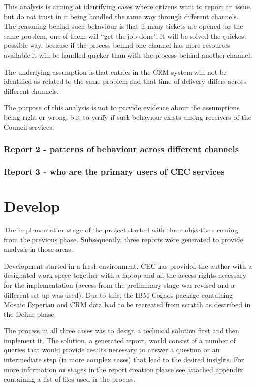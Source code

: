 This analysis is aiming at identifying cases where citizens want to report an issue, but do not trust in it being handled the same way through different channels. The reasoning behind such behaviour is that if many tickets are opened for the same problem, one of them will “get the job done”. It will be solved the quickest possible way, because if the process behind one channel has more resources available it will be handled quicker than with the process behind another channel.

The underlying assumption is that entries in the CRM system will not be identified as related to the same problem and that time of delivery differs across different channels.

The purpose of this analysis is not to provide evidence about the assumptions being right or wrong, but to verify if such behaviour exists among receivers of the Council services.
			
			\subsubsection{Report 2 - patterns of behaviour across different channels}
			
			\subsubsection{Report 3 - who are the primary users of CEC services}

	\section{Develop}
	
The implementation stage of the project started with three objectives coming from the previous phase. Subsequently, three reports were generated to provide analysis in those areas.

Development started in a fresh environment. CEC has provided the author with a designated work space together with a laptop and all the access rights necessary for the implementation (access from the preliminary stage was revised and a different set up was used). Due to this, the IBM Cognos package containing Mosaic Experian and CRM data had to be recreated from scratch as described in the Define phase.

The process in all three cases was to design a technical solution first and then implement it. The solution, a generated report, would consist of a number of queries that would provide results necessary to answer a question or an intermediate step (in more complex cases) that lead to the desired insights. For more information on stages in the report creation please see attached appendix containing a list of files used in the process.
	
